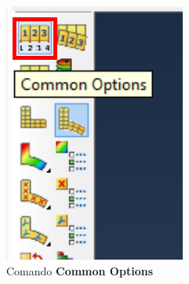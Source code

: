 \begin{enumerate}
  \begin{figure}[H]
    \centering
    \begin{subfigure}{0.19\textwidth}
      \includegraphics[width=\textwidth]{./body/images/imagen75.pdf}
      \caption{Comando \textbf{Common Options}}
      \label{figu75}
    \end{subfigure}%
    ~ %
    \begin{subfigure}{0.30\textwidth}

\end{subfigure}
\end{figure}
\end{enumerate}
